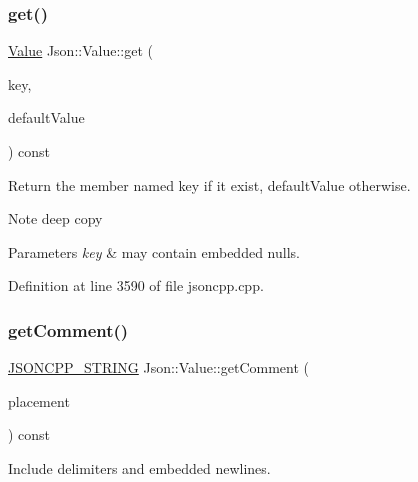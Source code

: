 \subsubsection{\texorpdfstring{get()}{get()}\hspace{0.1cm}{\footnotesize\ttfamily [8/8]}}
{\footnotesize\ttfamily \hyperlink{class_json_1_1_value}{Value} Json\+::\+Value\+::get (\begin{DoxyParamCaption}\item[{const \hyperlink{config_8h_a1e723f95759de062585bc4a8fd3fa4be}{J\+S\+O\+N\+C\+P\+P\+\_\+\+S\+T\+R\+I\+NG} \&}]{key,  }\item[{const \hyperlink{class_json_1_1_value}{Value} \&}]{default\+Value }\end{DoxyParamCaption}) const}

Return the member named key if it exist, default\+Value otherwise. \begin{DoxyNote}{Note}
deep copy 
\end{DoxyNote}

\begin{DoxyParams}{Parameters}
{\em key} & may contain embedded nulls. \\
\hline
\end{DoxyParams}


Definition at line 3590 of file jsoncpp.\+cpp.

\hypertarget{class_json_1_1_value_a82817229a986f0b254e31d5c83066ffe}{}\label{class_json_1_1_value_a82817229a986f0b254e31d5c83066ffe} 
\subsubsection{\texorpdfstring{get\+Comment()}{getComment()}\hspace{0.1cm}{\footnotesize\ttfamily [1/2]}}
{\footnotesize\ttfamily \hyperlink{config_8h_a1e723f95759de062585bc4a8fd3fa4be}{J\+S\+O\+N\+C\+P\+P\+\_\+\+S\+T\+R\+I\+NG} Json\+::\+Value\+::get\+Comment (\begin{DoxyParamCaption}\item[{\hyperlink{namespace_json_a4fc417c23905b2ae9e2c47d197a45351}{Comment\+Placement}}]{placement }\end{DoxyParamCaption}) const}



Include delimiters and embedded newlines. 

\hypertarget{class_json_1_1_value_a82817229a986f0b254e31d5c83066ffe}{}\label{class_json_1_1_value_a82817229a986f0b254e31d5c83066ffe} 
